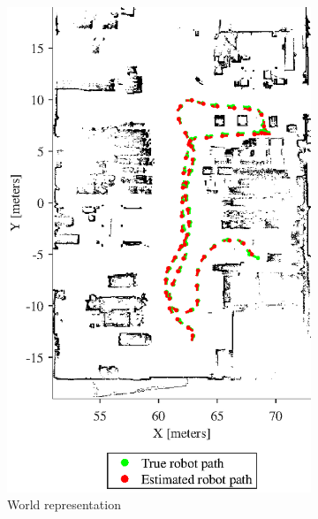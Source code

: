 \begin{figure}[htbp]
	\centering
	\begin{subfigure}[t]{0.45\textwidth}
		\includegraphics[width=\textwidth]{figures/static_mapping/simulation_poses_stage_map}
		\caption{World representation}
		\label{fig:simulated_small_world}
	\end{subfigure}
	\begin{subfigure}[t]{0.45\textwidth}

\end{subfigure}
\end{figure}
